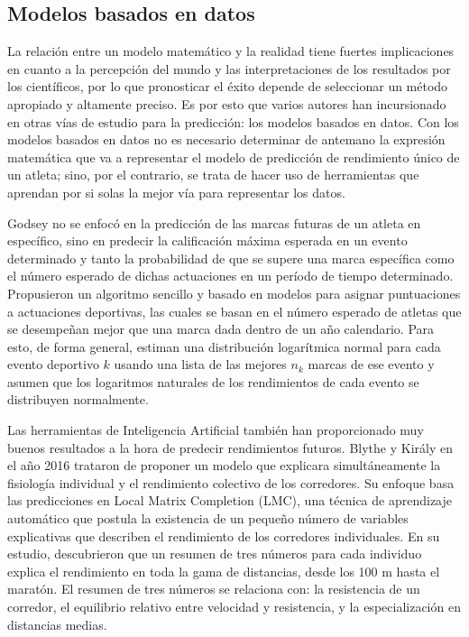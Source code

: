 \subsection{Modelos basados en datos}

La relación entre un modelo matemático y la realidad tiene fuertes implicaciones en cuanto a la percepción del mundo y las interpretaciones de los resultados por los científicos, por lo que pronosticar el éxito depende de seleccionar un método apropiado y altamente preciso. Es por esto que varios autores han incursionado en otras vías de estudio para la predicción: los modelos basados en datos. Con los modelos basados en datos no es necesario determinar de antemano la expresión matemática que va a representar el modelo de predicción de rendimiento único de un atleta; sino, por el contrario, se trata de hacer uso de herramientas que aprendan por si solas la mejor vía para representar los datos.

Godsey \cite{godsey2012brian} no se enfocó en la predicción de las marcas futuras de un atleta en específico, sino en predecir la calificación máxima esperada en un evento determinado y tanto la probabilidad de que se supere una marca específica como el número esperado de dichas actuaciones en un período de tiempo determinado. Propusieron un algoritmo sencillo y basado en modelos para asignar puntuaciones a actuaciones deportivas, las cuales se basan en el número esperado de atletas que se desempeñan mejor que una marca dada dentro de un año calendario. Para esto, de forma general, estiman una distribución logarítmica normal para cada evento deportivo $k$ usando una lista de las mejores $n_k$ marcas de ese evento y asumen que los logaritmos naturales de los rendimientos de cada evento se distribuyen normalmente.

Las herramientas de Inteligencia Artificial también han proporcionado muy buenos resultados a la hora de predecir rendimientos futuros. Blythe y Király en el año 2016 \cite{blythe2016prediction} trataron de proponer un modelo que explicara simultáneamente la fisiología individual y el rendimiento colectivo de los corredores. Su enfoque basa las predicciones en Local Matrix Completion (LMC), una técnica de aprendizaje automático que postula la existencia de un pequeño número de variables explicativas que describen el rendimiento de los corredores individuales. En su estudio, descubrieron que un resumen de tres números para cada individuo explica el rendimiento en toda la gama de distancias, desde los 100 m hasta el maratón. El resumen de tres números se relaciona con: la resistencia de un corredor, el equilibrio relativo entre velocidad y resistencia, y la especialización en distancias medias.

